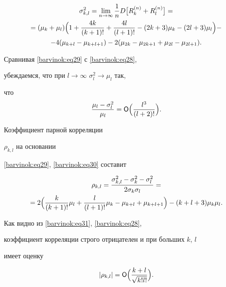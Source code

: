 \vspace{-5mm}



\begin{multline}

\label{barvinok:eq30} \sigma _{k,l}^2 =\lim \limits_{n\to \infty}

\frac{1}{n} D\bigl[ R_k^{(n)} +R_l^{(n)} \bigr]= \\ 

=(\mu _k +\mu _l)  \Bigl( 1+\frac{4k}{(k+1)!}+\frac{4l}{(l+1)!}-(2k+3)\mu _k -(2l+3)\mu _l\Bigr)- \\

-4(\mu _{k+l} -\mu _{k+l+1} )-2( \mu _{2k} -\mu _{2k+1} +\mu _{2l}

-\mu _{2l+1} ).

\end{multline}

Сравнивая \eqref{barvinok:eq29} с \eqref{barvinok:eq28},

убеждаемся, что при $l\to \infty$ $\sigma _l^2 \to \mu _l$ так,

что $$\frac{\mu _l -\sigma _l^2}{\mu _l}= {\sf O}

\Bigl(\frac{l^3}{(l+2)!} \Bigr).$$



Коэффициент парной корреляции 

$\rho_{k,l} $ на основании

\eqref{barvinok:eq29}, \eqref{barvinok:eq30} составит

\begin{multline}

\label{barvinok:eq31} \rho _{k,l} =\frac{\sigma _{k,l}^2

-\sigma _k^2 -\sigma _l^2 }{2\sigma _k \sigma _l } = \\ 

= 2\Bigl( \frac{k}{(k+1)!}\mu _l

+\frac{l}{(l+1)!}\mu _k -\mu _{k+l} +\mu _{k+l+1}

\Bigr)-(k+l+3)\mu_k \mu_l.

\end{multline}

Как видно из \eqref{barvinok:eq31}, \eqref{barvinok:eq28},

коэффициент корреляции строго отрицателен и при больших $k$, $l$

имеет оценку

\begin{equation}

\label{barvinok:eq32} | \rho _{k,l}  |={\sf O}\Bigl( \frac{k+l}{\sqrt

{k!l!} }\Bigr).

\end{equation}


